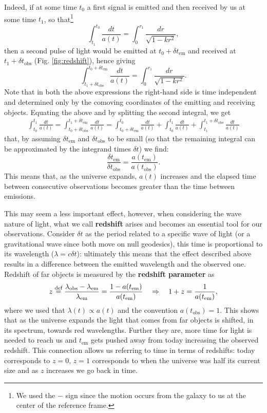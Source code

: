 Indeed, if at some time $t_0$ a first signal is emitted and then received by us at some time $t_1$, so that\footnote{We used the $-$ sign since the motion occurs from the galaxy to us at the center of the reference frame.}
$$\int_{t_1}^{t_0}\frac{dt}{a(t)}=\int_{0}^{r_1}\frac{dr}{\sqrt{1-kr^2}},$$ then a second pulse of light would be emitted at $t_0+\delta t_{\text{em}}$ and received at $t_1+\delta t_{\text{obs}}$ (Fig. \ref{fig:redshift}), hence giving $$\int_{t_1+\delta t_{\text{obs}}}^{t_0+\delta t_{\text{em}}}\frac{dt}{a(t)}=\int_{0}^{r_1}\frac{dr}{\sqrt{1-kr^2}}.$$
Note that in both the above expressions the right-hand side is time independent and determined only by the comoving coordinates of the emitting and receiving objects. Equating the above and by splitting the second integral, we get
\begin{align*}
    \int^{t_1}_{t_0}\frac{dt}{a(t)}=\int^{t_1+\delta t_{\text{em}}}_{t_0+\delta t_{\text{obs}}}\frac{dt}{a(t)}=\int_{t_0+\delta t_{\text{em}}}^{t_0}\frac{dt}{a(t)}+\int^{t_1}_{t_0}\frac{dt}{a(t)}+\int^{t_1+\delta t_{\text{obs}}}_{t_1}\frac{dt}{a(t)}
\end{align*}
that, by assuming $\delta t_{\text{em}}$ and $\delta t_{\text{obs}}$ to be small (so that the remaining integral can be approximated by the integrand times $\delta t$) we find:
\begin{equation}
    \label{eq:delta_t1/delta_t2}
    \frac{\delta t_{\text{em}}}{\delta t_{\text{obs}}}=\frac{a(t_{\text{em}})}{a(t_{\text{obs}})}.
\end{equation}
This means that, as the universe expands, $a(t)$ increases and the elapsed time between consecutive observations becomes greater than the time between emissions.

This may seem a less important effect, however, when considering the wave nature of light, what we call \textbf{redshift} arises and becomes an essential tool for our observations. Consider $\delta t$ as the period related to a specific wave of light (or a gravitational wave since both move on null geodesics), this time is proportional to its wavelength ($\lambda= c\delta t$): ultimately this means that the effect described above results in a difference between the emitted wavelength and the observed one.\\Redshift of far objects is measured by the \textbf{redshift parameter} as
\begin{equation}
    \label{eq:redshift}
    z\stackrel{\text{def}}{=}\frac{\lambda_{\text{obs}}-\lambda_{\text{em}}}{\lambda_{\text{em}}}=\frac{1-a(t_{\text{em}})}{a(t_\text{em})}\quad\Rightarrow\quad 1+z=\frac{1}{a(t_{\text{em}})},
\end{equation}
where we used that $\lambda(t)\propto a(t)$ and the convention $a(t_\text{obs})=1$. This shows that as the universe expands the light that comes from far objects is shifted, in its spectrum, towards red wavelengths. Further they are, more time for light is needed to reach us and $t_\text{em}$ gets pushed away from today increasing the observed redshift. This connection allows us referring to time in terms of redshifts: today corresponds to $z=0$, $z=1$ corresponds to when the universe was half its current size and as $z$ increases we go back in time.

